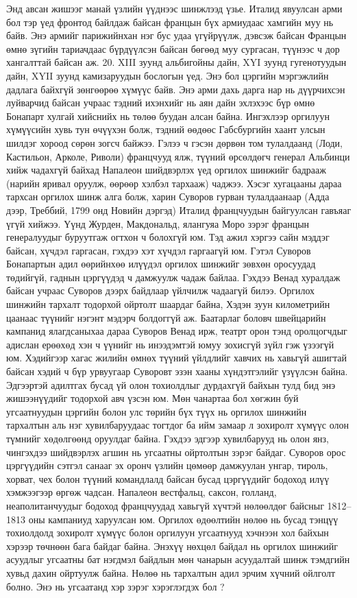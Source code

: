 Энд авсан жишээг манай үзлийн үүднээс шинжлээд үзье. Италид явуулсан арми бол тэр үед фронтод байлдаж байсан францын бүх армиудаас хамгийн муу нь байв. Энэ армийг парижийнхан нэг бус удаа үгүйрүүлж, дэвсэж байсан Францын өмнө зүгийн тариачдаас бүрдүүлсэн байсан бөгөөд муу сургасан, түүнээс ч дор хангалттай байсан аж. 20. XIII зуунд альбигойны дайн, XYI зуунд гугенотуудын дайн, XYII зуунд камизаруудын бослогын үед.
Энэ бол цэргийн мэргэжлийн дадлага байхгүй зөнгөөрөө хүмүүс байв. Энэ арми дахь дарга нар нь дүүрчихсэн луйварчид байсан учраас тэдний ихэнхийг нь аян дайн эхлэхээс бүр өмнө Бонапарт хулгай хийснийх нь төлөө буудан алсан байна. Ингэхлээр оргилуун хүмүүсийн хувь тун өчүүхэн болж, тэдний өөдөөс Габсбургийн хаант улсын шилдэг хороод сөрөн зогсч байжээ. Гэлээ ч гэсэн дөрвөн том тулалдаанд (Лоди, Кастильон, Арколе, Риволи) францчууд ялж, түүний өрсөлдөгч генерал Альбинци хийж чадахгүй байхад Напалеон шийдвэрлэх үед оргилох шинжийг бадрааж (нарийн яривал оруулж, өөрөөр хэлбэл тархааж) чаджээ. Хэсэг хугацааны дараа тархсан оргилох шинж алга болж, харин Суворов гурван тулалдаанаар (Адда дээр, Треббий, 1799 онд Новийн дэргэд) Италид францчуудын байгуулсан гавъяаг үгүй хийжээ. Үүнд Журден, Макдональд, ялангуяа Моро зэрэг францын генералуудыг буруутгаж огтхон ч болохгүй юм. Тэд ажил хэргээ сайн мэддэг байсан, хүчдэл гаргасан, гэхдээ хэт хүчдэл гаргаагүй юм. Гэтэл Суворов Бонапартын адил өөрийнхөө илүүдэл оргилох шинжийг зөвхөн оросуудад төдийгүй, гаднын цэргүүдэд ч дамжуулж чадаж байлаа. Гэхдээ Венад хуралдаж байсан учраас Суворов дээрх байдлаар үйлчилж чадаагүй билээ. Оргилох шинжийн тархалт тодорхой ойртолт шаардаг байна, Хэдэн зуун километрийн цаанаас түүнийг нэгэнт мэдэрч болдоггүй аж.
Баатарлаг боловч швейцарийн кампанид ялагдсаныхаа дараа Суворов Венад ирж, театрт орон тэнд оролцогчдыг адислан ерөөхөд хэн ч үүнийг нь инээдэмтэй юмуу зохисгүй зүйл гэж үзээгүй юм. Хэдийгээр хагас жилийн өмнөх түүний үйлдлийг хавчих нь хавьгүй ашигтай байсан хэдий ч бүр урвуугаар Суворовт эзэн хааны хүндэтгэлийг үзүүлсэн байна.
Эдгээртэй адилтгах бусад үй олон тохиолдлыг дурдахгүй байхын тулд бид энэ жишээнүүдийг тодорхой авч үзсэн юм. Мөн чанартаа бол хөгжин буй угсаатнуудын цэргийн болон улс төрийн бүх түүх нь оргилох шинжийн тархалтын аль нэг хувилбаруудаас тогтдог ба ийм замаар л зохиролт хүмүүс олон түмнийг хөдөлгөөнд оруулдаг байна.
Гэхдээ эдгээр хувилбарууд нь олон янз, чингэхдээ шийдвэрлэх агшин нь угсаатны ойртолтын зэрэг байдаг. Суворов орос цэргүүдийн сэтгэл санааг эх оронч үзлийн цөмөөр дамжуулан унгар, тироль, хорват, чех болон түүний командлалд байсан бусад цэргүүдийг бодоход илүү хэмжээгээр өргөж чадсан. Напалеон вестфальц, саксон, голланд, неаполитанчуудыг бодоход францчуудад хавьгүй хүчтэй нөлөөлдөг байсныг 1812–1813 оны кампаниуд харуулсан юм. Оргилох өдөөлтийн нөлөө нь бусад тэнцүү тохиолдолд зохиролт хүмүүс болон оргилуун угсаатнууд хэчнээн хол байхын хэрээр төчнөөн бага байдаг байна. Энэхүү нөхцөл байдал нь оргилох шинжийг асуудлыг угсаатны бат нэгдмэл байдлын мөн чанарын асуудалтай шинж тэмдгийн хувьд дахин ойртуулж байна. Нөлөө нь тархалтын адил эрчим хүчний ойлголт болно. Энэ нь угсаатанд хэр зэрэг хэрэглэгдэх бол ?
